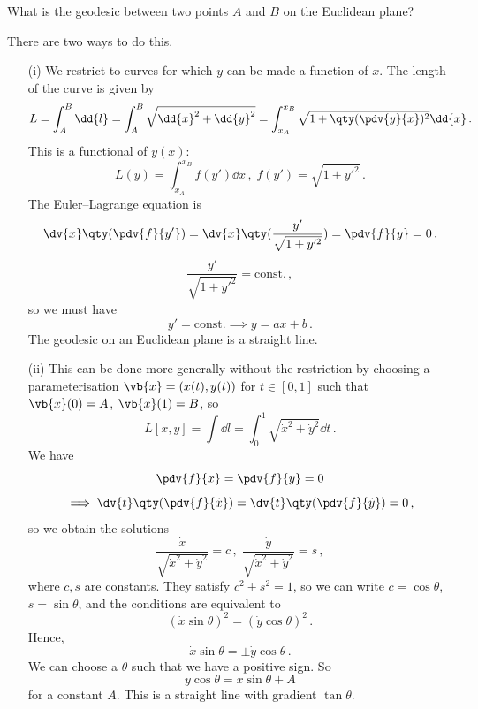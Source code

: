 \documentclass{article}
\theoremstyle{plain}\theoremheaderfont{\normalfont\itshape}\theorembodyfont{\rmfamily}\theoremseparator{.}\newtheorem*{rem}{Remark}\newtheorem*{ex}{Example}\newtheorem*{proof}{Proof}\newtheorem*{altp}{Alternative proof}
\theoremstyle{plain}\theoremheaderfont{\normalfont\bfseries}\theorembodyfont{\rmfamily}\theoremseparator{.}\newtheorem{thm}{Theorem}[section]\newtheorem{lem}[thm]{Lemma}\newtheorem{prop}[thm]{Proposition}\newtheorem*{cor}{Corollary}\newtheorem{defn}[thm]{Definition}\newtheorem{clm}[thm]{Claim}\newtheorem{clminproof}{Claim}
\theoremstyle{break}\theoremheaderfont{\normalfont\itshape}\theorembodyfont{\rmfamily}\theoremseparator{.\medskip}\newtheorem*{proofskip}{Proof}\newtheorem*{exs}{Examples}\newtheorem*{rems}{Remarks}
\theoremstyle{break}\theoremheaderfont{\normalfont\bfseries}\theorembodyfont{\rmfamily}\theoremseparator{.\medskip}\newtheorem{lemskip}[thm]{Lemma}\newtheorem{defnskip}[thm]{Definition}\newtheorem{propskip}[thm]{Proposition}\newtheorem{thmskip}[thm]{Theorem}
\numberwithin{equation}{section}
\begin{document}
	What is the geodesic between two points \(A\) and \(B\) on the Euclidean plane?

	There are two ways to do this.
	\begin{enumerate}[topsep=0pt]
		\item[(i)] We restrict to curves for which \(y\) can be made a function of \(x\). The length of the curve is given by
		\[L=\int_{A}^{B}\dd{l}=\int_{A}^{B}\sqrt{\dd{x}^2+\dd{y}^2}=\int_{x_A}^{x_B}\sqrt{1+\qty(\pdv{y}{x})^2}\dd{x}\,.\]
		This is a functional of \(y(x)\):
		\[L(y)=\int_{x_A}^{x_B}f(y')\dd{x}\,,\;f(y')=\sqrt{1+y'^2}\,.\]
		The Euler--Lagrange equation is
		\[\dv{x}\qty(\pdv{f}{y'})=\dv{x}\qty(\frac{y'}{\sqrt{1+y'^2}})=\pdv{f}{y}=0\,.\]
		\[\frac{y'}{\sqrt{1+y'^2}}=\text{const.}\,,\]
		so we must have
		\[y'=\text{const.}\implies y=ax+b\,.\]
		The geodesic on an Euclidean plane is a straight line.
		\item[(ii)] This can be done more generally without the restriction by choosing a parameterisation \(\vb{x}=(x(t),y(t))\) for \(t\in[0,1]\) such that \(\vb{x}(0)=A\), \(\vb{x}(1)=B\), so
		\[L[x,y]=\int\dd{l}=\int_{0}^{1}\sqrt{\dot{x}^2+\dot{y}^2}\dd{t}\,.\]
		We have
		\[\pdv{f}{x}=\pdv{f}{y}=0\]
		\[\implies\dv{t}\qty(\pdv{f}{\dot{x}})=\dv{t}\qty(\pdv{f}{\dot{y}})=0\,,\]
		so we obtain the solutions
		\[\frac{\dot{x}}{\sqrt{\dot{x}^2+\dot{y}^2}}=c\,,\;\frac{\dot{y}}{\sqrt{\dot{x}^2+\dot{y}^2}}=s\,,\]
		where \(c,s\) are constants. They satisfy \(c^2+s^2=1\), so we can write \(c=\cos\theta\), \(s=\sin\theta\), and the conditions are equivalent to
		\[(\dot{x}\sin\theta)^2=(\dot{y}\cos\theta)^2\,.\]
		Hence,
		\[\dot{x}\sin\theta=\pm\dot{y}\cos\theta\,.\]
		We can choose a \(\theta\) such that we have a positive sign. So
		\[y\cos\theta=x\sin\theta+A\]
		for a constant \(A\). This is a straight line with gradient \(\tan\theta\).
	\end{enumerate}
\end{document}
